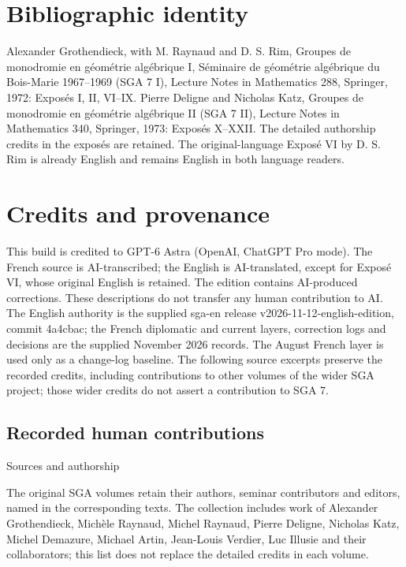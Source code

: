 \section*{Bibliographic identity}

Alexander Grothendieck, with M. Raynaud and D. S. Rim, Groupes de monodromie en géométrie algébrique I, Séminaire de géométrie algébrique du Bois-Marie 1967–1969 (SGA 7 I), Lecture Notes in Mathematics 288, Springer, 1972: Exposés I, II, VI–IX. Pierre Deligne and Nicholas Katz, Groupes de monodromie en géométrie algébrique II (SGA 7 II), Lecture Notes in Mathematics 340, Springer, 1973: Exposés X–XXII. The detailed authorship credits in the exposés are retained. The original-language Exposé VI by D. S. Rim is already English and remains English in both language readers.

\section*{Credits and provenance}

This build is credited to GPT-6 Astra (OpenAI, ChatGPT Pro mode). The French source is AI-transcribed; the English is AI-translated, except for Exposé VI, whose original English is retained. The edition contains AI-produced corrections. These descriptions do not transfer any human contribution to AI. The English authority is the supplied sga-en release v2026-11-12-english-edition, commit 4a4cbac; the French diplomatic and current layers, correction logs and decisions are the supplied November 2026 records. The August French layer is used only as a change-log baseline. The following source excerpts preserve the recorded credits, including contributions to other volumes of the wider SGA project; those wider credits do not assert a contribution to SGA 7.

\subsection*{Recorded human contributions}

Sources and authorship

The original SGA volumes retain their authors, seminar contributors and editors, named in the corresponding texts. The collection includes work of Alexander Grothendieck, Michèle Raynaud, Michel Raynaud, Pierre Deligne, Nicholas Katz, Michel Demazure, Michael Artin, Jean-Louis Verdier, Luc Illusie and their collaborators; this list does not replace the detailed credits in each volume.

